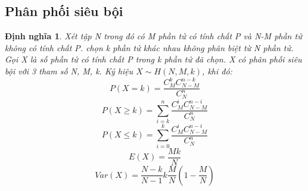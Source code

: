 \documentclass[12pt]{article}
\newtheorem{thm}{Định nghĩa}
\begin{document}
\subsection{Phân phối siêu bội}
\begin{thm}
    Xét tập N trong đó có M phần tử có tính chất P và N-M phần tử không có tính chất P. chọn k phần tử khác nhau không phân biệt từ N phần tử. Gọi X là số phần tử có tính chất P trong k phần tử đã chọn. X có phân phối siêu bội với 3 tham số N, M, k. Ký hiệu $X \sim H(N, M, k)$, khi đó:
    \begin{equation}
        P(X = k) = \frac{C_M^k C_{N-M}^{n-k}}{C_N^n}
    \end{equation}
    \begin{equation}
        P(X \geq k) = \sum_{i=k}^n \frac{C_M^i C_{N-M}^{n-i}}{C_N^n}
    \end{equation}
    \begin{equation}
        P(X \leq k) = \sum_{i=0}^k \frac{C_M^i C_{N-M}^{n-i}}{C_N^n}
    \end{equation}
    \begin{equation}
        E(X) = \frac{Mk}{N}
    \end{equation}
    \begin{equation}
        Var(X) = \frac{N-k}{N-1}k\frac{M}{N}(1 - \frac{M}{N})
    \end{equation}
\end{thm}
\end{document}
